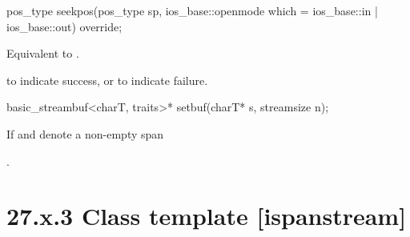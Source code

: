 \documentclass[ebook,11pt,article]{memoir}
\begin{document}
\begin{itemdecl}
pos_type seekpos(pos_type sp,
                 ios_base::openmode which
                   = ios_base::in | ios_base::out) override;
\end{itemdecl}

\begin{itemdescr}
\pnum
\effects
Equivalent to .

\pnum
\returns
{}
to indicate success, or
to indicate failure.
\end{itemdescr}

\begin{itemdecl}
basic_streambuf<charT, traits>* setbuf(charT* s, streamsize n);
\end{itemdecl}

\begin{itemdescr}
\pnum
\effects
If  and  denote a non-empty span

\pnum
\returns
{}.
\end{itemdescr}

\section{27.x.3 Class template  [ispanstream] }
\end{document}
